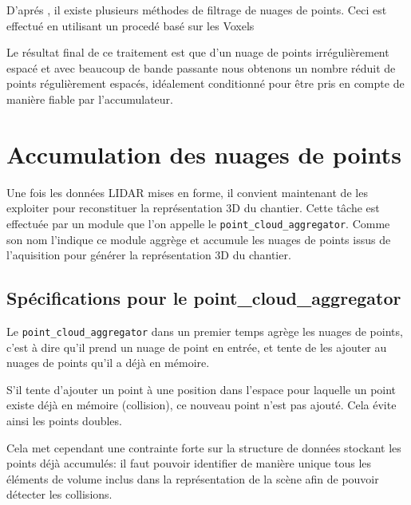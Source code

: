 \documentclass[12pt,a4paper]{report}
\begin{document}
		\para D'aprés \cite{moreno_comparative_2016}, il existe plusieurs méthodes de filtrage de nuages de points. Ceci est effectué en utilisant un procedé basé sur les Voxels
	

		\para Le résultat final de ce traitement est que d'un nuage de points irrégulièrement espacé et avec beaucoup de bande passante nous obtenons un nombre réduit de points régulièrement espacés, idéalement conditionné pour être pris en compte de manière fiable par l'accumulateur.
	

		

		
	\section{Accumulation des nuages de points}
	
	Une fois les données LIDAR mises en forme, il convient maintenant de les exploiter pour reconstituer la représentation 3D du chantier. Cette tâche est effectuée par un module que l'on appelle le \verb|point_cloud_aggregator|. Comme son nom l'indique ce module aggrège et accumule les nuages de points issus de l'aquisition pour générer la représentation 3D du chantier.
	
		\subsection{Spécifications pour le point\_cloud\_aggregator}
		Le \verb|point_cloud_aggregator| dans un premier temps agrège les nuages de points, c'est à dire qu'il prend un nuage de point en entrée, et tente de les ajouter au nuages de points qu'il a déjà en mémoire. 
		
		\para S'il tente d'ajouter un point à une position dans l'espace pour laquelle un point existe déjà en mémoire (collision), ce nouveau point n'est pas ajouté. Cela évite ainsi les points doubles.
		
		\para Cela met cependant une contrainte forte sur la structure de données stockant les points déjà accumulés: il faut pouvoir identifier de manière unique tous les éléments de volume inclus dans la représentation de la scène afin de pouvoir détecter les collisions.
		
\end{document}
